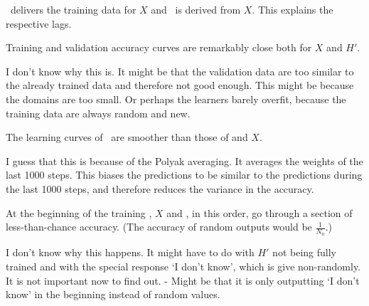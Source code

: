 \documentclass{farlamp}
\begin{document}
\AmpHp\ delivers the training data for $X$ and \Xpa\ is derived from $X$. This
explains the respective lags.

\begin{LCRow}
\end{LCRow}

\Obs Training and validation accuracy curves are remarkably close both
for $X$ and $H'$.

\Disc I don't know why this is. \OQ It might be that the validation data
are too similar to the already trained data and therefore not good enough. This
might be because the domains are too small. Or perhaps the learners barely
overfit, because the training data are always random and new.

\begin{LCRow}
\end{LCRow}

\Obs The learning curves of \Xpa\ are smoother than those of \AmpHp and $X$.

\Disc I guess that this is because of the Polyak averaging. It averages
the weights of the last 1000 steps. This biases the predictions to be similar to
the predictions during the last 1000 steps, and therefore reduces the variance
in the accuracy.

\begin{LCRow}
\end{LCRow}

\Obs At the beginning of the training \AmpHp, $X$ and \Xpa, in
this order, go through a section of less-than-chance accuracy. (The accuracy of
random outputs would be $\frac{1}{N_a}$.)

\Disc I don't know why this happens. \OQ It might have to do with $H'$ not being
fully trained and with the special response ‘I don't know’, which is give
non-randomly. It is not important now to find out. - Might be that it is only
outputting ‘I don't know’ in the beginning instead of random values.
\end{document}
